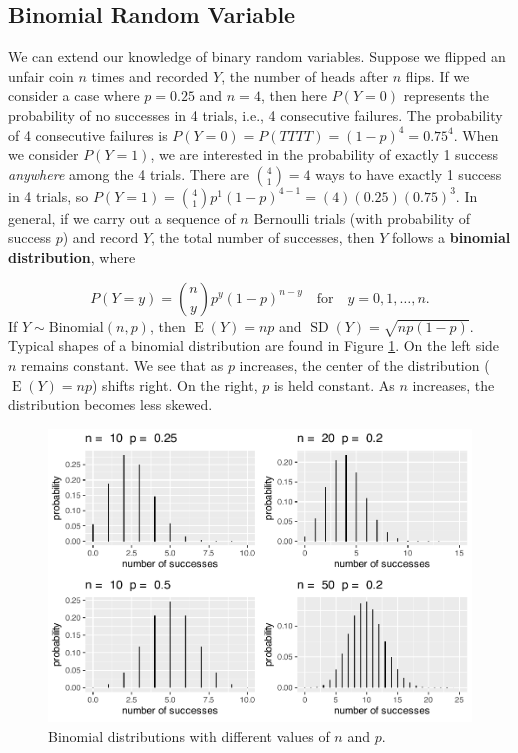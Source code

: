 \documentclass[
]{krantz}
\newcommand{\E}{\operatorname{E}}
\newcommand{\SD}{\operatorname{SD}}
\begin{document}
\subsection{Binomial Random Variable}\label{sec-binomial}

We can extend our knowledge of binary random variables. Suppose we flipped an unfair coin \(n\) times and recorded \(Y\), the number of heads after \(n\) flips. If we consider a case where \(p = 0.25\) and \(n = 4\), then here \(P(Y=0)\) represents the probability of no successes in 4 trials, i.e., 4 consecutive failures. The probability of 4 consecutive failures is \(P(Y = 0) = P(TTTT) = (1-p)^4 = 0.75^4\). When we consider \(P(Y = 1)\), we are interested in the probability of exactly 1 success \emph{anywhere} among the 4 trials. There are \(\binom{4}{1} = 4\) ways to have exactly 1 success in 4 trials, so \(P(Y = 1) = \binom{4}{1}p^1(1-p)^{4-1} = (4)(0.25)(0.75)^3\). In general, if we carry out a sequence of \(n\) Bernoulli trials (with probability of success \(p\)) and record \(Y\), the total number of successes, then \(Y\) follows a \textbf{binomial distribution},  where

\begin{equation}
P(Y=y) = \binom{n}{y} p^y (1-p)^{n-y} \quad \textrm{for} \quad y = 0, 1, \ldots, n.
\label{eq:binomRV}
\end{equation}
If \(Y \sim \textrm{Binomial}(n,p)\), then \(\E(Y) = np\) and \(\SD(Y) = \sqrt{np(1-p)}\).
Typical shapes of a binomial distribution are found in Figure \ref{fig:multBin}. On the left side \(n\) remains constant. We see that as \(p\) increases, the center of the distribution (\(\E(Y) = np\)) shifts right. On the right, \(p\) is held constant. As \(n\) increases, the distribution becomes less skewed.



\begin{figure}

{\centering \includegraphics[width=0.6\linewidth]{bookdown-BeyondMLR_files/figure-latex/multBin-1} 

}

\caption{Binomial distributions with different values of \(n\) and \(p\).}\label{fig:multBin}
\end{figure}
\end{document}
